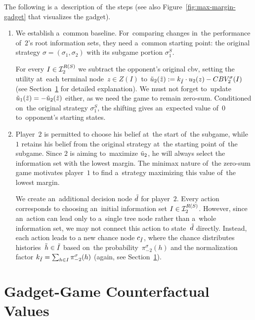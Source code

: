 The following is a~description of~the steps (see also Figure~\ref{fig:max-margin-gadget} that visualizes the gadget).
\begin{enumerate}
  \item We establish a~common baseline.
    For~comparing changes in~the performance of~$2$'s root information sets, they need a~common starting point:
    the original strategy $\sigma = (\sigma_1, \sigma_2)$ with its subgame portion $\sigma_1^S$.

    For every $I \in \mathcal{I}_2^{R(S)}$ we subtract the opponent's original \acrlong{cbv}, setting the utility at~each terminal node~$z \in Z(I)$ to $\tilde{u}_2(\tilde{z}) := k_{\tilde{I}} \cdot u_2(z) - CBV_2^{\sigma}(I)$ (see Section~\ref{sec:cfval-shifts} for detailed explanation).
    We must not forget to~update $\tilde{u}_1(\tilde{z}) = -\tilde{u}_2(\tilde{z})$ either, as we need the game to remain zero-sum.
    Conditioned on~the original strategy $\sigma_1^S$, the shifting gives an~expected value of~$0$ to~opponent's starting states.

  \item Player~$2$ is permitted to choose his belief at~the start of~the subgame, while $1$ retains his belief from the original strategy at~the starting point of~the subgame.
    Since $2$ is aiming to~maximize $\tilde{u}_2$, he will always select the information set with the lowest margin.
    The minimax nature of~the zero-sum game motivates player~$1$ to find a~strategy maximizing this value of~the lowest margin.

    We create an~additional decision node $\tilde{d}$ for player~$2$.
    Every action corresponds to choosing an~initial information set $I\in \mathcal{I}_2^{R(S)}$.
    However, since an~action can lead only to a~single tree node rather than a~whole information set, we may not connect this action to state~$\tilde{d}$ directly.
    Instead, each action leads to a new chance node $c_{\tilde{I}}$, where the chance distributes histories~$\tilde{h} \in \tilde{I}$ based on~the probability~$\pi_{-2}^\sigma (h)$ and the normalization factor $k_{\tilde{I}} = \sum_{ h \in I} \pi_{-2}^\sigma(h)$ (again, see Section~\ref{sec:cfval-shifts}).
\end{enumerate}

\section{Gadget-Game Counterfactual Values}
\label{sec:cfval-shifts}
%

